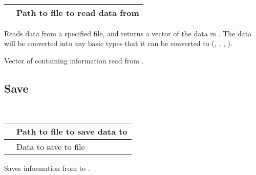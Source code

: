 \documentclass[letterpaper,10pt,english]{sphinxmanual}
\begin{document}
\begin{fulllineitems}
\label{\detokenize{data:_CPPv2N6pessum4LoadENSt6stringE}}%
\pysigstartmultiline
{}%
\pysigstopmultiline~

\begin{savenotes}\sphinxattablestart
\centering
\begin{tabulary}{\linewidth}[t]{|T|T|}
\hline

&
Path to file to read data from
\\
\hline
\end{tabulary}
\par
\sphinxattableend\end{savenotes}

Reads data from a specified file, and returns a vector of the data in
{\hyperref[\detokenize{datapoint:_CPPv2N6pessum9DataPointE}]{}}. The data will be converted into any basic types that it
can be converted to (, , , ).

 Vector of {\hyperref[\detokenize{datapoint:_CPPv2N6pessum9DataPointE}]{}} containing information read
from .

\end{fulllineitems}



\subsection{Save}
\label{\detokenize{data:save}}

\begin{fulllineitems}
\label{\detokenize{data:_CPPv2N6pessum4SaveENSt6stringENSt6vectorI9DataPointEE}}%
\pysigstartmultiline
{}%
\pysigstopmultiline~

\begin{savenotes}\sphinxattablestart
\centering
\begin{tabulary}{\linewidth}[t]{|T|T|}
\hline

&
Path to file to save data to
\\
\hline
{}
&
Data to save to file
\\
\hline
\end{tabulary}
\par
\sphinxattableend\end{savenotes}

Saves information from  to .

\end{fulllineitems}
\end{document}
